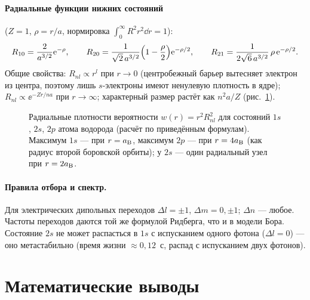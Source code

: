 \paragraph{Радиальные функции нижних состояний} ($Z=1$, $\rho=r/a$, нормировка $\int_0^\infty R^2r^2\dd r=1$):
\[
  R_{10}=\frac{2}{a^{3/2}}\mathrm{e}^{-\rho},\qquad
  R_{20}=\frac{1}{\sqrt2\,a^{3/2}}\Bigl(1-\frac\rho2\Bigr)\mathrm{e}^{-\rho/2},\qquad
  R_{21}=\frac{1}{2\sqrt6\,a^{3/2}}\,\rho\,\mathrm{e}^{-\rho/2}.
\]
Общие свойства: $R_{nl}\propto r^l$ при $r\to0$ (центробежный барьер вытесняет электрон из центра,
поэтому лишь $s$-электроны имеют ненулевую плотность в ядре); $R_{nl}\propto\ee^{-Zr/na}$ при $r\to\infty$;
характерный размер растёт как $n^2a/Z$ (рис.~\ref{fig:10:radial}).

\begin{figure}[htbp]
\centering
{}
\caption{Радиальные плотности вероятности $w(r)=r^2R_{nl}^2$ для состояний $1s$, $2s$, $2p$ атома водорода
(расчёт по приведённым формулам). Максимум $1s$ — при $r=a_{\mathrm B}$, максимум $2p$ — при $r=4a_{\mathrm B}$ (как радиус
второй боровской орбиты); у $2s$ — один радиальный узел при $r=2a_{\mathrm B}$.}
\label{fig:10:radial}
\end{figure}

\paragraph{Правила отбора и спектр.} Для электрических дипольных переходов $\Delta l=\pm1$,
$\Delta m=0,\pm1$; $\Delta n$ — любое. Частоты переходов даются той же формулой Ридберга, что и в
модели Бора. Состояние $2s$ не может распасться в $1s$ с испусканием одного фотона
($\Delta l=0$) — оно метастабильно (время жизни $\approx0{,}12$~с, распад с испусканием двух фотонов).

\section{Математические выводы}

